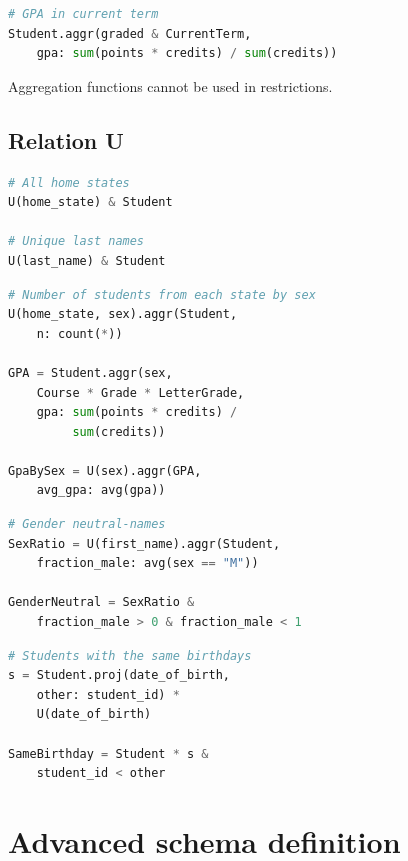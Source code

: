 \documentclass[letter,10pt]{article}
\begin{document}
\begin{lstlisting}[language=Python, caption={Reuse of variables}, label={lst:aggr3}]
# GPA in current term
Student.aggr(graded & CurrentTerm, 
    gpa: sum(points * credits) / sum(credits))
\end{lstlisting}

Aggregation functions cannot be used in restrictions. 
\subsection{Relation U}
\begin{lstlisting}[language=Python, morekeywords={avg, U}, caption={Creating a new entity.}, label={lst:u1}]
# All home states
U(home_state) & Student

# Unique last names
U(last_name) & Student 
\end{lstlisting}

\begin{lstlisting}[language=Python, morekeywords={avg, U}, caption={Aggregation by a new entity.}, label={lst:u2}]
# Number of students from each state by sex
U(home_state, sex).aggr(Student, 
    n: count(*))

GPA = Student.aggr(sex,
    Course * Grade * LetterGrade,
    gpa: sum(points * credits) /
         sum(credits))

GpaBySex = U(sex).aggr(GPA, 
    avg_gpa: avg(gpa))
\end{lstlisting}

\begin{lstlisting}[language=Python, morekeywords={avg, U}, caption={Aggregation and restriction.}, label={lst:u3}]
# Gender neutral-names
SexRatio = U(first_name).aggr(Student, 
    fraction_male: avg(sex == "M")) 

GenderNeutral = SexRatio & 
    fraction_male > 0 & fraction_male < 1
\end{lstlisting}

\begin{lstlisting}[language=Python, morekeywords={avg, U}, caption={Elevation of a secondary attribute.}, label={lst:u4} ]
# Students with the same birthdays
s = Student.proj(date_of_birth, 
    other: student_id) * 
    U(date_of_birth)

SameBirthday = Student * s & 
    student_id < other
\end{lstlisting}

\section{Advanced schema definition}\label{sec:def2}
\end{document}
